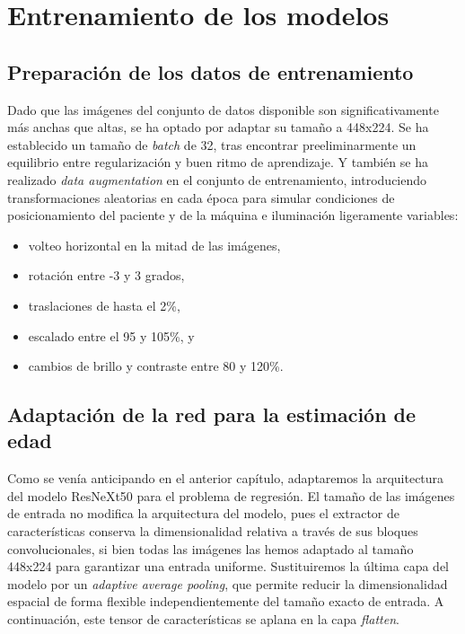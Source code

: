 
\section{Entrenamiento de los modelos}

\subsection{Preparación de los datos de entrenamiento}

Dado que las imágenes del conjunto de datos disponible son significativamente más anchas que altas, se ha 
optado por adaptar su tamaño a 448x224.  
Se ha establecido un tamaño de \textit{batch} de 32, tras encontrar preeliminarmente un equilibrio entre 
regularización y buen ritmo de aprendizaje. 
Y también se ha realizado \textit{data augmentation} en el conjunto de entrenamiento, introduciendo 
transformaciones aleatorias en cada época para simular condiciones de posicionamiento del paciente y de la 
máquina e iluminación ligeramente variables: 
\begin{itemize}
    \item volteo horizontal en la mitad de las imágenes,
    \item rotación entre -3 y 3 grados,
    \item traslaciones de hasta el 2\%,
    \item escalado entre el 95 y 105\%, y
    \item cambios de brillo y contraste entre 80 y 120\%. 
\end{itemize}


\subsection{Adaptación de la red para la estimación de edad}

Como se venía anticipando en el anterior capítulo, adaptaremos la arquitectura del modelo ResNeXt50 para el 
problema de regresión. El tamaño de las imágenes de entrada no modifica la arquitectura del modelo, pues el 
extractor de características conserva la dimensionalidad relativa a través de sus bloques convolucionales, 
si bien todas las imágenes las hemos adaptado al tamaño 448x224 para garantizar una entrada uniforme.
Sustituiremos la última capa del modelo por un \textit{adaptive average pooling}, que permite reducir la 
dimensionalidad espacial de forma flexible independientemente del tamaño exacto de entrada. A continuación, 
este tensor de características se aplana en la capa \textit{flatten}.

